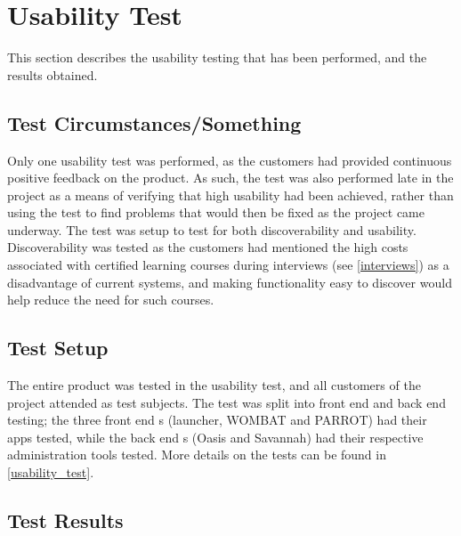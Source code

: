 \section{Usability Test}
This section describes the usability testing that has been performed, and the results obtained. 

\subsection{Test Circumstances/Something}
Only one usability test was performed, as the customers had provided continuous positive feedback on the product. 
As such, the test was also performed late in the project as a means of verifying that high usability had been achieved, rather than using the test to find problems that would then be fixed as the project came underway. \newline
The test was setup to test for both discoverability and usability. 
Discoverability was tested as the customers had mentioned the high costs associated with certified learning courses during interviews (see \autoref{interviews}) as a disadvantage of current systems, and making functionality easy to discover would help reduce the need for such courses.

\subsection{Test Setup}
The entire \giraf[] product was tested in the usability test, and all customers of the project attended as test subjects. 
The test was split into front end and back end testing; the three front end \localgroup[]s (launcher, WOMBAT and PARROT) had their apps tested, while the back end \localgroup[]s (Oasis and Savannah) had their respective administration tools tested. 
More details on the tests can be found in \autoref{usability_test}.

\subsection{Test Results}
